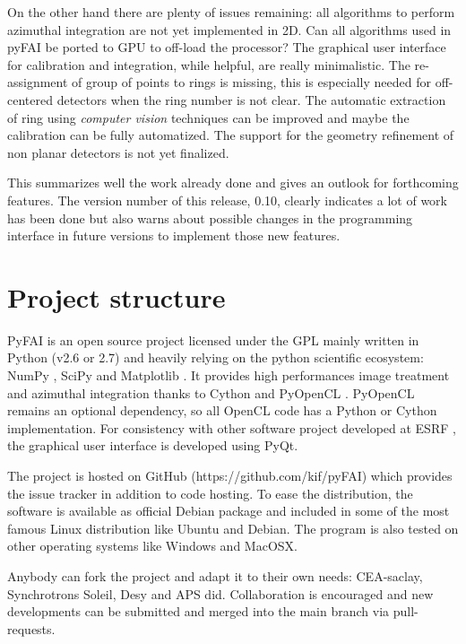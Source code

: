 \documentclass[preprint]{iucr}
\begin{document}
On the other hand there are plenty of issues remaining: all algorithms to
perform azimuthal integration are not yet implemented in 2D. 
Can all algorithms used in
pyFAI be ported to GPU to off-load the processor? The graphical user interface
for calibration and integration, while helpful, are really minimalistic.
The re-assignment of group of points to rings is missing, this is
especially needed for off-centered detectors when the ring number is not clear.
The automatic extraction of ring using \textit{computer vision} techniques can
be improved and maybe the calibration can be fully automatized.
The support for the geometry refinement of non planar detectors is not yet
finalized.

This summarizes well the work already done and gives an
outlook for forthcoming features.
The version number of this release, 0.10, clearly indicates a lot of work has
been done but also warns about possible changes in the programming interface
in future versions to implement those new features.




\appendix
\section{Project structure}

PyFAI is an open source project licensed under the GPL mainly written in Python (v2.6 or 2.7)
and heavily relying on the python scientific ecosystem: NumPy \cite{numpy},
SciPy \cite{scipy} and Matplotlib \cite{matplotlib}.
It provides high performances image treatment and azimuthal integration thanks
to Cython \cite{cython} and PyOpenCL \cite{pyopencl}.
PyOpenCL remains an optional dependency, so all OpenCL code has a
Python or Cython implementation.
For consistency with other software project developed at ESRF \cite{pymca},
the graphical user interface is developed using PyQt.

The project is hosted on GitHub (https://github.com/kif/pyFAI) which provides
the issue tracker in addition to code hosting.
To ease the distribution, the
software is available as official Debian package and included in some of the
most famous Linux distribution like Ubuntu and Debian.
The program is also tested on other operating systems like Windows and
MacOSX.

Anybody can fork the project and adapt it to their own needs: CEA-saclay,
Synchrotrons Soleil, Desy and APS did. Collaboration is encouraged and
new developments can be submitted and merged into the main branch
via pull-requests.
\end{document}
